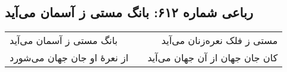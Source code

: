 \begin{center}
\section*{رباعی شماره ۶۱۲: بانگ مستی ز آسمان می‌آید}
\label{sec:0612}
\begin{longtable}{l p{0.5cm} r}
بانگ مستی ز آسمان می‌آید
&&
مستی ز فلک نعره‌زنان می‌آید
\\
از نعرهٔ او جان جهان می‌شورد
&&
کان جان جهان از آن جهان می‌آید
\\
\end{longtable}
\end{center}
